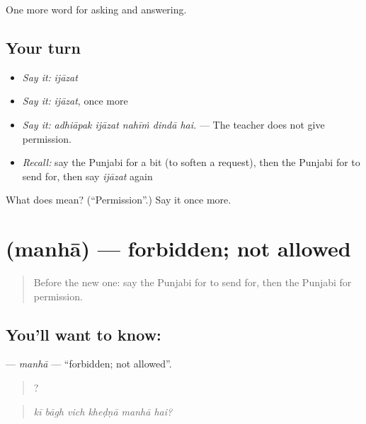 \begin{grammarlens}[title={What you've built}]
One more word for asking and answering.
\end{grammarlens}

\subsection*{Your turn}
\begin{itemize}
\raggedright
  \item \emph{Say it:} \emph{ijāzat}
  \item \emph{Say it:} \emph{ijāzat}, once more
  \item \emph{Say it:} \emph{adhiāpak ijāzat nahīṁ dindā hai.} — The teacher does not give permission.
  \item \emph{Recall:} say the Punjabi for a bit (to soften a request), then the Punjabi for to send for, then say \emph{ijāzat} again
\end{itemize}

\begin{tcolorbox}[breakable,colback=teal!4,colframe=teal!35!black,title={Before you move on}]
What does  mean? (\textquotedblleft{}Permission\textquotedblright{}.) Say it once more.
\end{tcolorbox}
\section[\texorpdfstring{\pa{ਮਨ੍ਹਾ} (manhā)}{ਮਨ੍ਹਾ (manhā)}]{ (manhā) — forbidden; not allowed}

\label{lesson:PA-C338-manha}



\begin{quote}
Before the new one: say the Punjabi for to send for, then the Punjabi for permission.
\end{quote}

\subsection*{You'll want to know: }
\textbf{} — \emph{manhā} — \textquotedblleft{}forbidden; not allowed\textquotedblright{}.

\begin{quote}
     ?
\end{quote}

\begin{quote}
\emph{kī bāgh vich kheḍṇā manhā hai?}
\end{quote}

